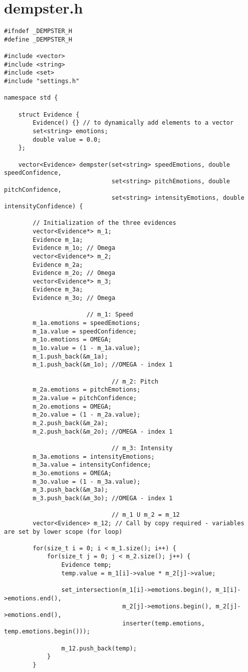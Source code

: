 \section*{dempster.h}
\begin{lstlisting}[caption=Code dempster.h]
#ifndef _DEMPSTER_H
#define _DEMPSTER_H

#include <vector>
#include <string>
#include <set>
#include "settings.h"

namespace std {

	struct Evidence {
		Evidence() {} // to dynamically add elements to a vector 
		set<string> emotions;
		double value = 0.0;
	};

	vector<Evidence> dempster(set<string> speedEmotions, double speedConfidence,
							  set<string> pitchEmotions, double pitchConfidence,
							  set<string> intensityEmotions, double intensityConfidence) {

		// Initialization of the three evidences
		vector<Evidence*> m_1;
		Evidence m_1a;
		Evidence m_1o; // Omega
		vector<Evidence*> m_2;
		Evidence m_2a;
		Evidence m_2o; // Omega
		vector<Evidence*> m_3;
		Evidence m_3a;
		Evidence m_3o; // Omega

					   // m_1: Speed
		m_1a.emotions = speedEmotions;
		m_1a.value = speedConfidence;
		m_1o.emotions = OMEGA;
		m_1o.value = (1 - m_1a.value);
		m_1.push_back(&m_1a);
		m_1.push_back(&m_1o); //OMEGA - index 1

							  // m_2: Pitch
		m_2a.emotions = pitchEmotions;
		m_2a.value = pitchConfidence;
		m_2o.emotions = OMEGA;
		m_2o.value = (1 - m_2a.value);
		m_2.push_back(&m_2a);
		m_2.push_back(&m_2o); //OMEGA - index 1

							  // m_3: Intensity
		m_3a.emotions = intensityEmotions;
		m_3a.value = intensityConfidence;
		m_3o.emotions = OMEGA;
		m_3o.value = (1 - m_3a.value);
		m_3.push_back(&m_3a);
		m_3.push_back(&m_3o); //OMEGA - index 1

							  // m_1 U m_2 = m_12
		vector<Evidence> m_12; // Call by copy required - variables are set by lower scope (for loop)

		for(size_t i = 0; i < m_1.size(); i++) {
			for(size_t j = 0; j < m_2.size(); j++) {
				Evidence temp;
				temp.value = m_1[i]->value * m_2[j]->value;

				set_intersection(m_1[i]->emotions.begin(), m_1[i]->emotions.end(),
								 m_2[j]->emotions.begin(), m_2[j]->emotions.end(),
								 inserter(temp.emotions, temp.emotions.begin()));

				m_12.push_back(temp);
			}
		}


\end{lstlisting}

